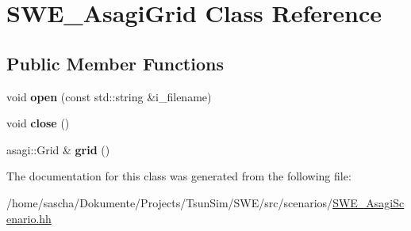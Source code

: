 \hypertarget{classSWE__AsagiGrid}{\section{S\-W\-E\-\_\-\-Asagi\-Grid Class Reference}
\label{classSWE__AsagiGrid}
}
\subsection*{Public Member Functions}
\begin{DoxyCompactItemize}
\item 
\hypertarget{classSWE__AsagiGrid_a36c68a45fd51ed1bae1971ac252ed1cc}{void {\bfseries open} (const std\-::string \&i\-\_\-filename)}\label{classSWE__AsagiGrid_a36c68a45fd51ed1bae1971ac252ed1cc}

\item 
\hypertarget{classSWE__AsagiGrid_ab0dca1af30b0d89f3a68f429c77b0840}{void {\bfseries close} ()}\label{classSWE__AsagiGrid_ab0dca1af30b0d89f3a68f429c77b0840}

\item 
\hypertarget{classSWE__AsagiGrid_a8596fb0fdadd3ab51760d7101d6e89d1}{asagi\-::\-Grid \& {\bfseries grid} ()}\label{classSWE__AsagiGrid_a8596fb0fdadd3ab51760d7101d6e89d1}

\end{DoxyCompactItemize}


The documentation for this class was generated from the following file\-:\begin{DoxyCompactItemize}
\item 
/home/sascha/\-Dokumente/\-Projects/\-Tsun\-Sim/\-S\-W\-E/src/scenarios/\hyperlink{SWE__AsagiScenario_8hh}{S\-W\-E\-\_\-\-Asagi\-Scenario.\-hh}\end{DoxyCompactItemize}
